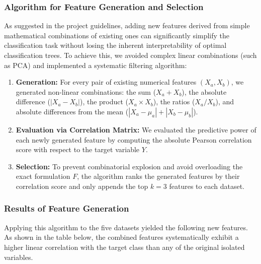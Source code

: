 \documentclass[11pt,a4paper]{article}
\begin{document}
\subsubsection{Algorithm for Feature Generation and Selection}
As suggested in the project guidelines, adding new features derived from simple mathematical combinations of existing ones can significantly simplify the classification task without losing the inherent interpretability of optimal classification trees. To achieve this, we avoided complex linear combinations (such as PCA) and implemented a systematic filtering algorithm:

\begin{enumerate}
    \item \textbf{Generation:} For every pair of existing numerical features $(X_a, X_b)$, we generated non-linear combinations: the sum ($X_a + X_b$), the absolute difference ($|X_a - X_b|$), the product ($X_a \times X_b$), the ratios ($X_a / X_b$), and absolute differences from the mean ($|X_a - \mu_a| + |X_b - \mu_b|$).
    \item \textbf{Evaluation via Correlation Matrix:} We evaluated the predictive power of each newly generated feature by computing the absolute Pearson correlation score with respect to the target variable $Y$.
    \item \textbf{Selection:} To prevent combinatorial explosion and avoid overloading the exact formulation $F$, the algorithm ranks the generated features by their correlation score and only appends the top $k=3$ features to each dataset.
\end{enumerate}

\subsubsection{Results of Feature Generation}

Applying this algorithm to the five datasets yielded the following new features. As shown in the table below, the combined features systematically exhibit a higher linear correlation with the target class than any of the original isolated variables.
\end{document}
